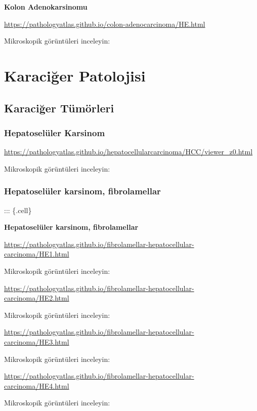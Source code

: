 \documentclass[
  letterpaper,
  DIV=11,
  numbers=noendperiod]{scrreprt}
\begin{document}
\textbf{Kolon Adenokarsinomu}

\url{https://pathologyatlas.github.io/colon-adenocarcinoma/HE.html}

Mikroskopik görüntüleri inceleyin:

\part{Karaciğer Patolojisi}

\hypertarget{karaciux11fer-tuxfcmuxf6rleri}{%
\chapter{Karaciğer Tümörleri}\label{karaciux11fer-tuxfcmuxf6rleri}}

\hypertarget{hepatoseluxfcler-karsinom}{%
\section{Hepatoselüler Karsinom}\label{hepatoseluxfcler-karsinom}}

\url{https://pathologyatlas.github.io/hepatocellularcarcinoma/HCC/viewer_z0.html}

Mikroskopik görüntüleri inceleyin:

\hypertarget{hepatoseluxfcler-karsinom-fibrolamellar}{%
\section{Hepatoselüler karsinom,
fibrolamellar}\label{hepatoseluxfcler-karsinom-fibrolamellar}}

::: \{.cell\}

\textbf{Hepatoselüler karsinom, fibrolamellar}

\url{https://pathologyatlas.github.io/fibrolamellar-hepatocellular-carcinoma/HE1.html}

Mikroskopik görüntüleri inceleyin:

\url{https://pathologyatlas.github.io/fibrolamellar-hepatocellular-carcinoma/HE2.html}

Mikroskopik görüntüleri inceleyin:

\url{https://pathologyatlas.github.io/fibrolamellar-hepatocellular-carcinoma/HE3.html}

Mikroskopik görüntüleri inceleyin:

\url{https://pathologyatlas.github.io/fibrolamellar-hepatocellular-carcinoma/HE4.html}

Mikroskopik görüntüleri inceleyin:
\end{document}
